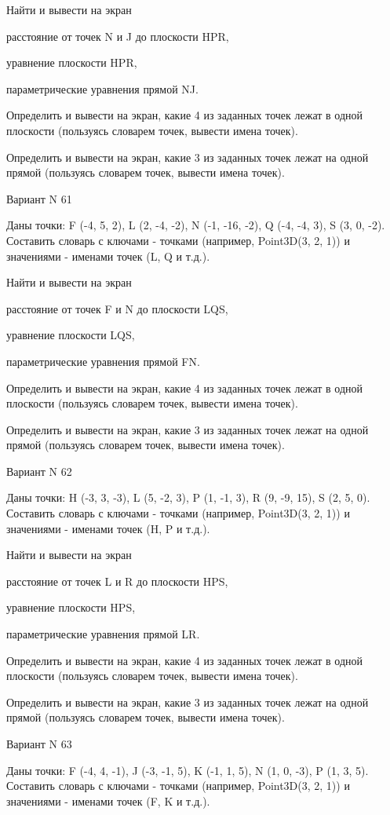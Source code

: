 \documentclass[11pt]{report}
\begin{document}
 
Найти и вывести на экран


расстояние от точек N и J до плоскости HPR,

 
уравнение плоскости HPR,

 
параметрические уравнения прямой NJ.


Определить и вывести на экран, какие 4 из заданных точек лежат в одной плоскости (пользуясь словарем точек, вывести имена точек).


Определить и вывести на экран, какие 3 из заданных точек лежат на одной прямой (пользуясь словарем точек, вывести имена точек).

Вариант N 61

Даны точки: F (-4, 5, 2), L (2, -4, -2), N (-1, -16, -2), Q (-4, -4, 3), S (3, 0, -2).
Составить словарь с ключами - точками (например, Point3D(3, 2, 1)) и значениями - именами точек (L, Q и т.д.).

 
Найти и вывести на экран


расстояние от точек F и N до плоскости LQS,

 
уравнение плоскости LQS,

 
параметрические уравнения прямой FN.


Определить и вывести на экран, какие 4 из заданных точек лежат в одной плоскости (пользуясь словарем точек, вывести имена точек).


Определить и вывести на экран, какие 3 из заданных точек лежат на одной прямой (пользуясь словарем точек, вывести имена точек).

Вариант N 62

Даны точки: H (-3, 3, -3), L (5, -2, 3), P (1, -1, 3), R (9, -9, 15), S (2, 5, 0).
Составить словарь с ключами - точками (например, Point3D(3, 2, 1)) и значениями - именами точек (H, P и т.д.).

 
Найти и вывести на экран


расстояние от точек L и R до плоскости HPS,

 
уравнение плоскости HPS,

 
параметрические уравнения прямой LR.


Определить и вывести на экран, какие 4 из заданных точек лежат в одной плоскости (пользуясь словарем точек, вывести имена точек).


Определить и вывести на экран, какие 3 из заданных точек лежат на одной прямой (пользуясь словарем точек, вывести имена точек).

Вариант N 63

Даны точки: F (-4, 4, -1), J (-3, -1, 5), K (-1, 1, 5), N (1, 0, -3), P (1, 3, 5).
Составить словарь с ключами - точками (например, Point3D(3, 2, 1)) и значениями - именами точек (F, K и т.д.).
\end{document}
